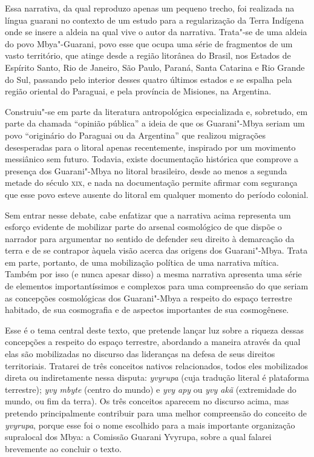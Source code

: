 \bigskip
\bigskip
Essa narrativa, da qual reproduzo apenas um pequeno trecho, foi
realizada na língua guarani no contexto de um estudo para a
regularização da Terra Indígena onde se insere a aldeia na qual vive o
autor da narrativa. Trata"-se de uma aldeia do povo Mbya"-Guarani, povo
esse que ocupa uma série de fragmentos de um vasto território, que
atinge desde a região litorânea do Brasil, nos Estados de Espírito
Santo, Rio de Janeiro, São Paulo, Paraná, Santa Catarina e Rio Grande
do Sul, passando pelo interior desses quatro últimos estados e se
espalha pela região oriental do Paraguai, e pela província de
Misiones, na Argentina.

Construiu"-se em parte da literatura antropológica especializada e,
sobretudo, em parte da chamada ``opinião pública'' a ideia de que os
Guarani"-Mbya seriam um povo ``originário do Paraguai ou da Argentina''
que realizou migrações desesperadas para o litoral apenas recentemente,
inspirado por um movimento messiânico sem futuro. Todavia, existe
documentação histórica que comprove a presença dos Guarani"-Mbya no
litoral brasileiro, desde ao menos a segunda metade do século \textsc{xix}, e
nada na documentação permite afirmar com segurança que esse povo esteve
ausente do litoral em qualquer momento do período colonial.

Sem entrar nesse debate, cabe enfatizar que a narrativa acima representa
um esforço evidente de mobilizar parte do arsenal cosmológico de que
dispõe o narrador para argumentar no sentido de defender seu direito à
demarcação da terra e de se contrapor àquela visão acerca das origens
dos Guarani"-Mbya. Trata em parte, portanto, de uma mobilização política
de uma narrativa mítica. Também por isso (e nunca apesar disso) a mesma
narrativa apresenta uma série de elementos importantíssimos e complexos
para uma compreensão do que seriam as concepções cosmológicas dos
Guarani"-Mbya a respeito do espaço terrestre habitado, de sua
cosmografia e de aspectos importantes de sua cosmogênese.

Esse é o tema central deste texto, que pretende lançar luz sobre a
riqueza dessas concepções a respeito do espaço terrestre, abordando a
maneira através da qual elas são mobilizadas no discurso das lideranças
na defesa de seus direitos territoriais. Tratarei de três conceitos
nativos relacionados, todos eles mobilizados direta ou indiretamente
nessa disputa: \emph{yvyrupa} (cuja tradução literal é plataforma terrestre);
\emph{yvy mbyte} (centro do mundo) e \emph{yvy apy} ou \emph{yvy akã} (extremidade do mundo,
ou fim da terra). Os três conceitos aparecem no discurso acima, mas
pretendo principalmente contribuir para uma melhor compreensão do
conceito de \emph{yvyrupa}, porque esse foi o nome escolhido para a mais
importante organização supralocal dos Mbya: a Comissão Guarani Yvyrupa,
sobre a qual falarei brevemente ao concluir o texto.


